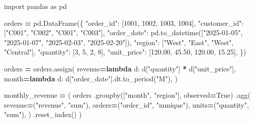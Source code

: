 \documentclass[
  12pt,
]{article}
\newenvironment{Shaded}{\begin{snugshade}}{\end{snugshade}}
\newcommand{\DecValTok}[1]{\textcolor[rgb]{0.00,0.00,0.81}{#1}}
\newcommand{\FloatTok}[1]{\textcolor[rgb]{0.00,0.00,0.81}{#1}}
\newcommand{\ImportTok}[1]{#1}
\newcommand{\KeywordTok}[1]{\textcolor[rgb]{0.13,0.29,0.53}{\textbf{#1}}}
\newcommand{\NormalTok}[1]{#1}
\newcommand{\OperatorTok}[1]{\textcolor[rgb]{0.81,0.36,0.00}{\textbf{#1}}}
\newcommand{\StringTok}[1]{\textcolor[rgb]{0.31,0.60,0.02}{#1}}
\newcommand{\VariableTok}[1]{\textcolor[rgb]{0.00,0.00,0.00}{#1}}
\begin{document}
\begin{Shaded}
\begin{Highlighting}[]
\ImportTok{import}\NormalTok{ pandas }\ImportTok{as}\NormalTok{ pd}

\NormalTok{orders }\OperatorTok{=}\NormalTok{ pd.DataFrame(\{}
    \StringTok{"order\_id"}\NormalTok{: [}\DecValTok{1001}\NormalTok{, }\DecValTok{1002}\NormalTok{, }\DecValTok{1003}\NormalTok{, }\DecValTok{1004}\NormalTok{],}
    \StringTok{"customer\_id"}\NormalTok{: [}\StringTok{"C001"}\NormalTok{, }\StringTok{"C002"}\NormalTok{, }\StringTok{"C001"}\NormalTok{, }\StringTok{"C003"}\NormalTok{],}
    \StringTok{"order\_date"}\NormalTok{: pd.to\_datetime([}\StringTok{"2025{-}01{-}05"}\NormalTok{, }\StringTok{"2025{-}01{-}07"}\NormalTok{, }\StringTok{"2025{-}02{-}03"}\NormalTok{, }\StringTok{"2025{-}02{-}20"}\NormalTok{]),}
    \StringTok{"region"}\NormalTok{: [}\StringTok{"West"}\NormalTok{, }\StringTok{"East"}\NormalTok{, }\StringTok{"West"}\NormalTok{, }\StringTok{"Central"}\NormalTok{],}
    \StringTok{"quantity"}\NormalTok{: [}\DecValTok{3}\NormalTok{, }\DecValTok{5}\NormalTok{, }\DecValTok{2}\NormalTok{, }\DecValTok{8}\NormalTok{],}
    \StringTok{"unit\_price"}\NormalTok{: [}\FloatTok{120.00}\NormalTok{, }\FloatTok{45.50}\NormalTok{, }\FloatTok{120.00}\NormalTok{, }\FloatTok{15.25}\NormalTok{],}
\NormalTok{\})}

\NormalTok{orders }\OperatorTok{=}\NormalTok{ orders.assign(}
\NormalTok{    revenue}\OperatorTok{=}\KeywordTok{lambda}\NormalTok{ d: d[}\StringTok{"quantity"}\NormalTok{] }\OperatorTok{*}\NormalTok{ d[}\StringTok{"unit\_price"}\NormalTok{],}
\NormalTok{    month}\OperatorTok{=}\KeywordTok{lambda}\NormalTok{ d: d[}\StringTok{"order\_date"}\NormalTok{].dt.to\_period(}\StringTok{"M"}\NormalTok{),}
\NormalTok{)}

\NormalTok{monthly\_revenue }\OperatorTok{=}\NormalTok{ (}
\NormalTok{    orders}
\NormalTok{    .groupby([}\StringTok{"month"}\NormalTok{, }\StringTok{"region"}\NormalTok{], observed}\OperatorTok{=}\VariableTok{True}\NormalTok{)}
\NormalTok{    .agg(}
\NormalTok{        revenue}\OperatorTok{=}\NormalTok{(}\StringTok{"revenue"}\NormalTok{, }\StringTok{"sum"}\NormalTok{),}
\NormalTok{        orders}\OperatorTok{=}\NormalTok{(}\StringTok{"order\_id"}\NormalTok{, }\StringTok{"nunique"}\NormalTok{),}
\NormalTok{        units}\OperatorTok{=}\NormalTok{(}\StringTok{"quantity"}\NormalTok{, }\StringTok{"sum"}\NormalTok{),}
\NormalTok{    )}
\NormalTok{    .reset\_index()}
\NormalTok{)}
\end{Highlighting}
\end{Shaded}
\end{document}
